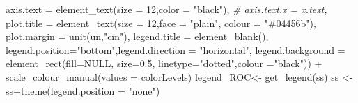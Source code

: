 \documentclass[
]{article}
\newenvironment{Shaded}{\begin{snugshade}}{\end{snugshade}}
\newcommand{\AttributeTok}[1]{\textcolor[rgb]{0.77,0.63,0.00}{#1}}
\newcommand{\CommentTok}[1]{\textcolor[rgb]{0.56,0.35,0.01}{\textit{#1}}}
\newcommand{\ConstantTok}[1]{\textcolor[rgb]{0.00,0.00,0.00}{#1}}
\newcommand{\DecValTok}[1]{\textcolor[rgb]{0.00,0.00,0.81}{#1}}
\newcommand{\FloatTok}[1]{\textcolor[rgb]{0.00,0.00,0.81}{#1}}
\newcommand{\FunctionTok}[1]{\textcolor[rgb]{0.00,0.00,0.00}{#1}}
\newcommand{\NormalTok}[1]{#1}
\newcommand{\OtherTok}[1]{\textcolor[rgb]{0.56,0.35,0.01}{#1}}
\newcommand{\SpecialCharTok}[1]{\textcolor[rgb]{0.00,0.00,0.00}{#1}}
\newcommand{\StringTok}[1]{\textcolor[rgb]{0.31,0.60,0.02}{#1}}
\begin{document}
\begin{Shaded}
\begin{Highlighting}[]
        \AttributeTok{axis.text =} \FunctionTok{element\_text}\NormalTok{(}\AttributeTok{size =} \DecValTok{12}\NormalTok{,}\AttributeTok{color =} \StringTok{"black"}\NormalTok{),}
        \CommentTok{\# axis.text.x = x.text,}
        \AttributeTok{plot.title =} \FunctionTok{element\_text}\NormalTok{(}\AttributeTok{size =} \DecValTok{12}\NormalTok{,}\AttributeTok{face =} \StringTok{"plain"}\NormalTok{,}
                                      \AttributeTok{colour =} \StringTok{"\#04456b"}\NormalTok{),}
        \AttributeTok{plot.margin =} \FunctionTok{unit}\NormalTok{(un,}\StringTok{"cm"}\NormalTok{),}
        \AttributeTok{legend.title =} \FunctionTok{element\_blank}\NormalTok{(),}
        \AttributeTok{legend.position=}\StringTok{"bottom"}\NormalTok{,}\AttributeTok{legend.direction =} \StringTok{"horizontal"}\NormalTok{,}
        \AttributeTok{legend.background =} \FunctionTok{element\_rect}\NormalTok{(}\AttributeTok{fill=}\ConstantTok{NULL}\NormalTok{, }\AttributeTok{size=}\FloatTok{0.5}\NormalTok{,}
                                         \AttributeTok{linetype=}\StringTok{"dotted"}\NormalTok{,}\AttributeTok{colour =}\StringTok{"black"}\NormalTok{)) }\SpecialCharTok{+}
      \FunctionTok{scale\_colour\_manual}\NormalTok{(}\AttributeTok{values =}\NormalTok{ colorLevels)}
\NormalTok{    legend\_ROC}\OtherTok{\textless{}{-}} \FunctionTok{get\_legend}\NormalTok{(ss)}
\NormalTok{    ss }\OtherTok{\textless{}{-}}\NormalTok{ ss}\SpecialCharTok{+}\FunctionTok{theme}\NormalTok{(}\AttributeTok{legend.position =} \StringTok{"none"}\NormalTok{)}
  

\end{Highlighting}
\end{Shaded}
\end{document}
